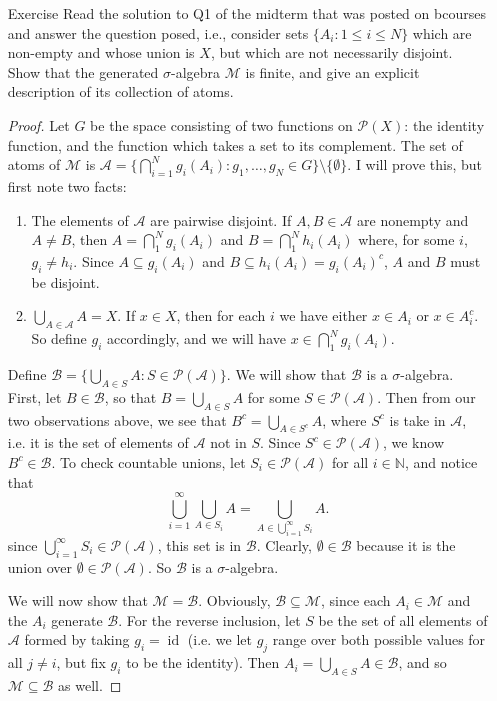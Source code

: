 \documentclass[10pt]{article}
\newcommand{\N}{\mathbb{N}}
\newcommand{\A}{\mathcal{A}}
\newcommand{\M}{\mathcal{M}}
\newcommand{\B}{\mathcal{B}}
\DeclareMathOperator*{\id}{id}
\renewcommand{\P}{\mathcal{P}}
\begin{document}
\begin{enumerate}
\item[Exercise]  Read the solution to Q1 of the midterm that was posted on bcourses and answer the question posed, i.e., consider sets $\{A_i : 1 \leq i \leq N\}$ which are non-empty and whose union is $X$, but which are not necessarily disjoint. Show that the generated $\sigma$-algebra $\M$ is finite, and give an explicit description of its collection of atoms.

\begin{proof}
Let $G$ be the space consisting of two functions on $\P(X)$: the identity function, and the function which takes a set to its complement.  The set of atoms of $\M$ is $\A = \{\bigcap_{i=1}^N g_i(A_i) : g_1, \dots , g_N \in G \} \setminus \{\emptyset\}$.  I will prove this, but first note two facts:
\begin{enumerate}
\item The elements of $\A$ are pairwise disjoint.  If $A,B \in \A$ are nonempty and $A \neq B$, then $A = \bigcap_1^N g_i(A_i)$ and $B = \bigcap_1^N h_i(A_i)$ where, for some $i$, $g_i \neq h_i$.  Since $A \subseteq g_i(A_i)$ and $B \subseteq h_i(A_i) = g_i(A_i)^c$, $A$ and $B$ must be disjoint.
\item $\bigcup_{A \in \A} A = X$.  If $x \in X$, then for each $i$ we have either $x \in A_i$ or $x \in A_i^c$.  So define $g_i$ accordingly, and we will have $x \in \bigcap_1^N g_i(A_i)$.
\end{enumerate}

Define $\B = \{ \bigcup_{A \in S} A : S \in \P(\A)  \}$.  We will show that $\B$ is a $\sigma$-algebra. First, let $B \in \B$, so that $B = \bigcup_{A \in S}A$ for some $S \in \P(\A)$.  Then from our two observations above, we see that $B^c = \bigcup_{A \in S^c} A$, where $S^c$ is take in $\A$, i.e. it is the set of elements of $\A$ not in $S$.  Since $S^c \in \P(\A)$, we know $B^c \in \B$.  To check countable unions, let $S_i \in \P(\A)$ for all $i \in \N$, and notice that
$$
\bigcup_{i=1}^\infty \bigcup_{A \in S_i} A = \bigcup_{A \in \bigcup_{i=1}^\infty S_i} A.
$$
since $\bigcup_{i=1}^\infty S_i \in \P(\A)$, this set is in $\B$.  Clearly, $\emptyset \in \B$ because it is the union over $\emptyset \in \P(\A)$.  So $\B$ is a $\sigma$-algebra.

We will now show that $\M = \B$.  Obviously, $\B \subseteq \M$, since each $A_i \in \M$ and the $A_i$ generate $\B$.  For the reverse inclusion, let $S$ be the set of all elements of $\A$ formed by taking $g_i = \id$ (i.e. we let $g_j$ range over both possible values for all $j \neq i$, but fix $g_i$ to be the identity).  Then $A_i = \bigcup_{A \in S} A \in \B$, and so $\M \subseteq \B$ as well.


\end{proof}
\end{enumerate}
\end{document}
